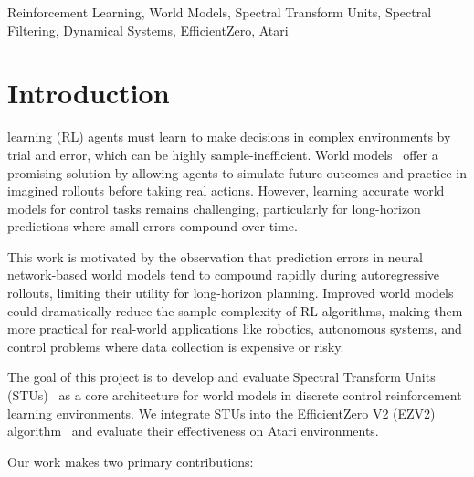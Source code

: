 \documentclass[10pt,twocolumn]{IEEEtran}
\begin{document}
\begin{IEEEkeywords}
Reinforcement Learning, World Models, Spectral Transform Units, Spectral Filtering, Dynamical Systems, EfficientZero, Atari
\end{IEEEkeywords}

\section{Introduction}
\label{sec:introduction}

 learning (RL) agents must learn to make decisions in complex environments by trial and error, which can be highly sample-inefficient. World models~\cite{ha2018world} offer a promising solution by allowing agents to simulate future outcomes and practice in imagined rollouts before taking real actions. However, learning accurate world models for control tasks remains challenging, particularly for long-horizon predictions where small errors compound over time.

This work is motivated by the observation that prediction errors in neural network-based world models tend to compound rapidly during autoregressive rollouts, limiting their utility for long-horizon planning. Improved world models could dramatically reduce the sample complexity of RL algorithms, making them more practical for real-world applications like robotics, autonomous systems, and control problems where data collection is expensive or risky.

The goal of this project is to develop and evaluate Spectral Transform Units (STUs)~\cite{agarwal2023spectral} as a core architecture for world models in discrete control reinforcement learning environments. We integrate STUs into the EfficientZero V2 (EZV2) algorithm~\cite{wang2024efficientzero} and evaluate their effectiveness on Atari environments.

Our work makes two primary contributions:
\end{document}
